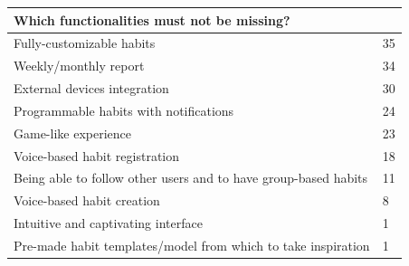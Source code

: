 \documentclass{article}
\begin{document}
\begin{table}[H]
	\centering
	\begin{tabularx}{0.9\textwidth}{X|p{1in}}
		\hline
		\multicolumn{2}{l}{\textbf{Which functionalities must not be missing?}} \\
		\hline
		Fully-customizable habits                                       & 35    \\
		\hline
		Weekly/monthly report                                           & 34    \\
		\hline
		External devices integration                                    & 30    \\
		\hline
		Programmable habits with notifications                          & 24    \\
		\hline
		Game-like experience                                            & 23    \\
		\hline
		Voice-based habit registration                                  & 18    \\
		\hline
		Being able to follow other users and to have group-based habits & 11    \\
		\hline
		Voice-based habit creation                                      & 8     \\
		\hline
		Intuitive and captivating interface                             & 1     \\
		\hline
		Pre-made habit templates/model from which to take inspiration   & 1     \\
		\hline
	\end{tabularx}
\end{table}
\end{document}
